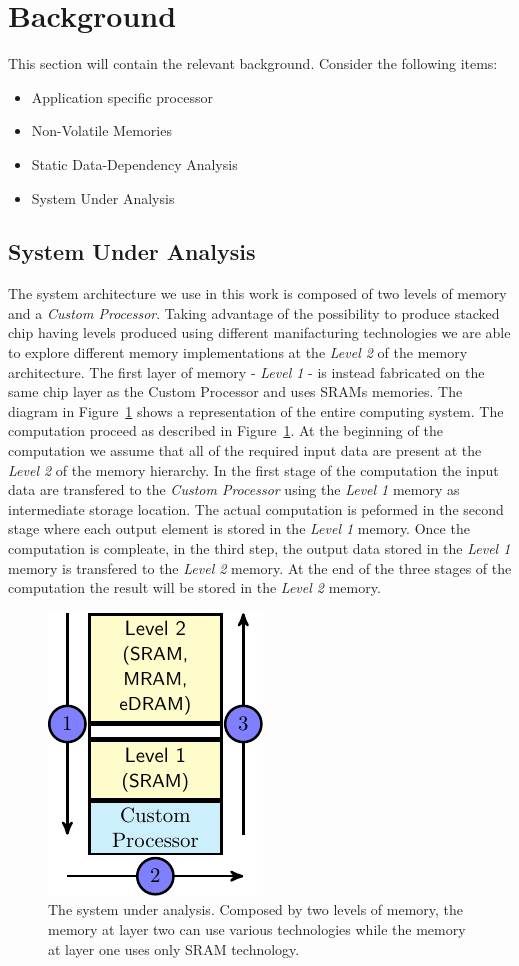 \section{Background}
This section will contain the relevant background. Consider the following items:
\begin{itemize}
\item Application specific processor
\item Non-Volatile Memories
\item Static Data-Dependency Analysis
\item System Under Analysis
\end{itemize}

\subsection{System Under Analysis}
\label{ssec:system_under_analysis}
The system architecture we use in this work is composed of two levels of memory and a \textit{Custom Processor}. Taking advantage of the possibility to produce stacked chip having levels produced using different manifacturing technologies we are able to explore different memory implementations at the \textit{Level 2} of the memory architecture. The first layer of memory - \textit{Level 1} - is instead fabricated on the same chip layer as the Custom Processor and uses SRAMs memories. The diagram in Figure~\ref{fig:system} shows a representation of the entire computing system.
The computation proceed as described in Figure~\ref{fig:system}. At the beginning of the computation we assume that all of the required input data are present at the \textit{Level 2} of the memory hierarchy. In the first stage of the computation the input data are transfered to the \textit{Custom Processor} using the \textit{Level 1} memory as intermediate storage location. The actual computation is peformed in the second stage where each output element is stored in the \textit{Level 1} memory. Once the computation is compleate, in the third step, the output data stored in the \textit{Level 1} memory is transfered to the \textit{Level 2} memory. At the end of the three stages of the computation the result will be stored in the \textit{Level 2} memory.

\begin{figure}[tb] 
\centering
\includegraphics[width=0.25\columnwidth]{images/architecture.pdf}
\caption{\small The system under analysis. Composed by two levels of memory, the memory at layer two can use various technologies while the memory at layer one uses only SRAM technology.}
\label{fig:system}
\end{figure}

